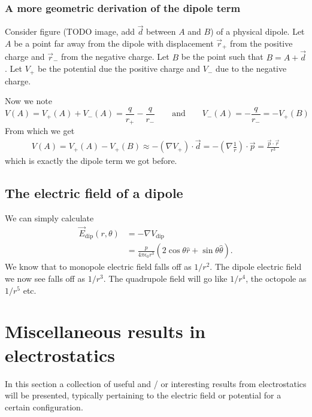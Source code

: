 \subsubsection{A more geometric derivation of the dipole term}
Consider figure (TODO image, add $\vec{d}$ between $A$ and $B$) of a physical dipole. Let $A$ be a point far away from the dipole with displacement $\vec{r}_+$ from the positive charge and $\vec{r}_-$ from the negative charge. Let $B$ be the point such that $B = A + \vec{d}$. Let $V_+$ be the potential due the positive charge and $V_-$ due to the negative charge.

Now we note
\[ V(A) = V_+(A) + V_-(A) = \frac{q}{r_+} - \frac{q}{r_-} \qquad \text{and} \qquad V_-(A) = -\frac{q}{r_-} = -V_+(B) \]
From which we get
\begin{align*}
V(A) = V_+(A)-V_+(B) \approx - (\nabla V_+)\cdot \vec{d} = - \left(\nabla\frac{1}{r}\right)\cdot \vec{p} = \frac{\vec{p}\cdot\vec{r}}{r^3}
\end{align*}
which is exactly the dipole term we got before.

\subsection{The electric field of a dipole}
We can simply calculate
\begin{align*}
\vec{E}_\text{dip}(r,\theta) &= -\nabla V_\text{dip} \\
&= \frac{p}{4\pi\epsilon_0 r^3}(2\cos\theta \hat{r} + \sin\theta \hat{\theta}).
\end{align*}
We know that to monopole electric field falls off as $1/r^2$. The dipole electric field we now see falls off as $1/r^3$. The quadrupole field will go like $1/r^4$, the octopole as $1/r^5$ etc.

\section{Miscellaneous results in electrostatics}
In this section a collection of useful and / or interesting results from electrostatics will be presented, typically pertaining to the electric field or potential for a certain configuration.
